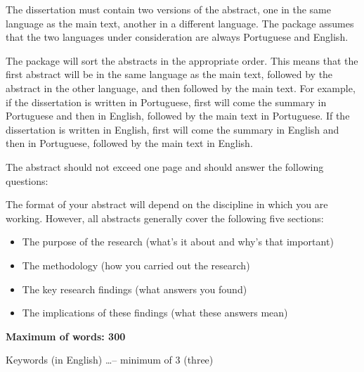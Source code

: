 The dissertation must contain two versions of the abstract, one in the same language as the main text, another in a different language.  The package assumes that the two languages under consideration are always Portuguese and English.

The package will sort the abstracts in the appropriate order. This means that the first abstract will be in the same language as the main text, followed by the abstract in the other language, and then followed by the main text. For example, if the dissertation is written in Portuguese, first will come the summary in Portuguese and then in English, followed by the main text in Portuguese. If the dissertation is written in English, first will come the summary in English and then in Portuguese, followed by the main text in English.

The abstract should not exceed one page and should answer the following questions:

The format of your abstract will depend on the discipline in which you are working. However, all abstracts generally cover the following five sections:
\begin{itemize}
	\item The purpose of the research (what’s it about and why’s that important)
	\item The methodology (how you carried out the research)
	\item The key research findings (what answers you found)
	\item The implications of these findings (what these answers mean)
\end{itemize}
\textbf{Maximum of words: 300}
\begin{keywords}
Keywords (in English) \ldots -- minimum of 3 (three)
\end{keywords} 
